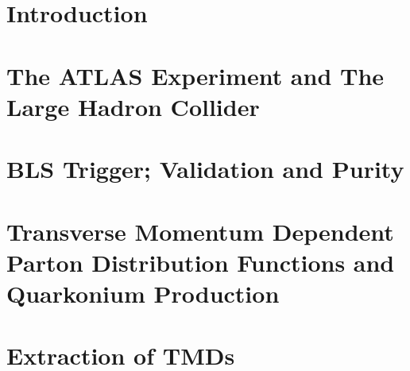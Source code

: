 \documentclass[twoside,12pt, a4paper]{report}
\begin{document}




\clearpage



\clearpage



\clearpage



\clearpage



\clearpage

\tableofcontents

\clearpage

\listoftables

\clearpage

\listoffigures

\clearpage


\pagestyle{main}

\chapter{Introduction}


\chapter{The ATLAS Experiment and The Large Hadron Collider}


\chapter{BLS Trigger; Validation and Purity}

\chapter{Transverse Momentum Dependent Parton Distribution Functions and Quarkonium Production}

\chapter{Extraction of TMDs}
\end{document}
